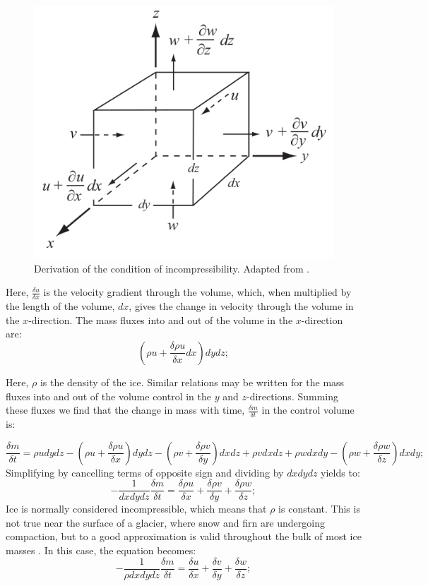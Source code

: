 \documentclass{article}
\begin{document}
\begin{figure}[!h]
	\centering
	\includegraphics[width=0.5\linewidth]{../fig/Control_volume.png}
	\caption{Derivation of the condition of incompressibility. Adapted from \cite{hooke2019principles}.}
	\label{control_volume}
\end{figure}

Here, $\frac{\delta u}{\delta x}$ is the velocity gradient through the volume, which, when multiplied by the length of the volume, $dx$, gives the change in velocity through the volume in the $x$-direction. The mass fluxes into and out of the volume in the $x$-direction are:
\begin{equation}
	({\rho u + \frac{\delta \rho u}{\delta x}dx})dy dz;
\end{equation}

Here, $\rho$ is the density of the ice. Similar relations may be written for the mass fluxes into and out of the volume control in the $y$ and $z$-directions. Summing these fluxes we find that the change in mass with time, $\frac{\delta m}{\delta t}$ in the control volume is:

\begin{equation}
	\frac{\delta m}{\delta t}=\rho u dydz-({\rho u+\frac{\delta \rho u}{\delta x}})dydz-({\rho v+\frac{\delta \rho v}{\delta y}})dxdz+\rho vdxdz+\rho wdxdy-({\rho w+\frac{\delta \rho w}{\delta z}})dxdy;
\end{equation}
Simplifying by cancelling terms of opposite sign and dividing by $dxdydz$ yields to:
\begin{equation}
	-\frac{1}{dxdydz}\frac{\delta m}{\delta t}=\frac{\delta \rho u}{\delta x}+\frac{\delta \rho v}{\delta y}+\frac{\delta \rho w}{\delta z};
\end{equation}
Ice is normally considered incompressible, which means that $\rho$ is constant. This is not true near the surface of a glacier, where snow and firn are undergoing compaction, but to a good approximation is valid throughout the bulk of most ice masses \cite[]{hooke2019principles}. In this case, the equation becomes:
\begin{equation}
	-\frac{1}{\rho dxdydz}\frac{\delta m}{\delta t}=\frac{\delta u}{\delta x}+\frac{\delta v}{\delta y}+\frac{\delta w}{\delta z};
\end{equation}
\end{document}
